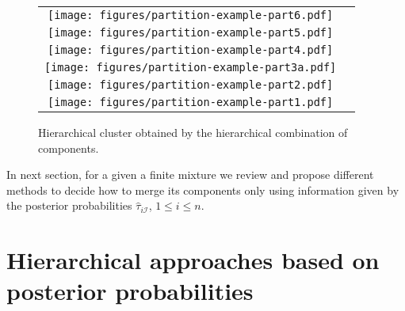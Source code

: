 \documentclass[10pt, a4paper]{article}
\begin{document}
\begin{figure}[thbp]
\begin{center}
\begin{tabular}{cc}
  \texttt{[image: figures/partition-example-part6.pdf]} \\
    \texttt{[image: figures/partition-example-part5.pdf]} \\
      \texttt{[image: figures/partition-example-part4.pdf]} \\
        \texttt{[image: figures/partition-example-part3a.pdf]} \\
          \texttt{[image: figures/partition-example-part2.pdf]} \\
            \texttt{[image: figures/partition-example-part1.pdf]}
 \end{tabular}
 \caption{Hierarchical cluster obtained by the hierarchical combination of components.}\label{hierarchical}
\end{center}
\end{figure}

In next section, for a given a finite mixture we review and propose different methods to decide how to merge its components only using information given by the posterior probabilities $\hat{\tau}_{i \mathcal{I}}$, $1\leq i \leq n$.



\section{Hierarchical approaches based on posterior probabilities}
\label{old_methods}

\end{document}
